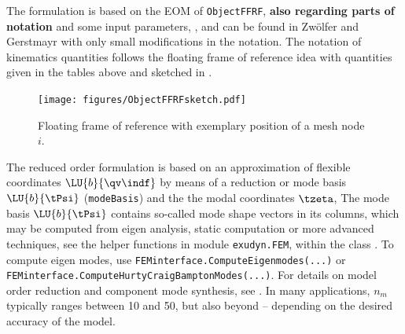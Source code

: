     \finishTable
    The formulation is based on the EOM of \texttt{ObjectFFRF}, {\bf also regarding parts of notation} 
    and some input parameters, , and 
    can be found in Zw{\"o}lfer and Gerstmayr \cite{ZwoelferGerstmayr2021} with only small modifications in the notation.
    The notation of kinematics quantities follows the floating frame of reference idea with
    quantities given in the tables above and sketched in .
    \begin{figure}[tbph]
      \begin{center}
      \texttt{[image: figures/ObjectFFRFsketch.pdf]}
      \end{center}
      \caption{Floating frame of reference with exemplary position of a mesh node $i$.}
    	\label{fig:ObjectFFRFreducedOrder:mesh}
    \end{figure}

                       
    The reduced order  formulation is based on an approximation of flexible coordinates $\LU{b}{\qv\indf}$ 
    by means of a reduction or mode basis $\LU{b}{\tPsi}$ (\texttt{modeBasis}) and the the modal coordinates $\tzeta$,
    \be
       \approx {} \tzeta
    \ee
    The mode basis $\LU{b}{\tPsi}$ contains so-called mode shape vectors in its columns, which may be computed from eigen analysis, static computation or more advanced techniques, 
    see the helper functions in module \texttt{exudyn.FEM}, within the class .
    To compute eigen modes, use \texttt{FEMinterface.ComputeEigenmodes(...)} or
    \texttt{FEMinterface.ComputeHurtyCraigBamptonModes(...)}. For details on model order reduction and component mode synthesis, see .
    In many applications, $n_m$ typically ranges between 10 and 50, but also beyond -- depending on the desired accuracy of the model.
    
